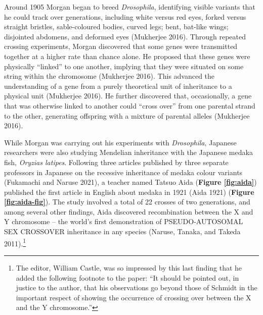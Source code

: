 \documentclass[
]{book}
\begin{document}
Around 1905 Morgan began to breed \emph{Drosophila}, identifying visible variants that he could track over generations, including white versus red eyes, forked versus straight bristles, sable-coloured bodies, curved legs; bent, bat-like wings; disjointed abdomens, and deformed eyes (Mukherjee 2016). Through repeated crossing experiments, Morgan discovered that some genes were transmitted together at a higher rate than chance alone. He proposed that these genes were physically ``linked'' to one another, implying that they were situated on some string within the chromosome (Mukherjee 2016). This advanced the understanding of a gene from a purely theoretical unit of inheritance to a physical unit (Mukherjee 2016). He further discovered that, occasionally, a gene that was otherwise linked to another could ``cross over'' from one parental strand to the other, generating offspring with a mixture of parental alleles (Mukherjee 2016).

While Morgan was carrying out his experiments with \emph{Drosophila}, Japanese researchers were also studying Mendelian inheritance with the Japanese medaka fish, \emph{Oryzias latipes}. Following three articles published by three separate professors in Japanese on the recessive inheritance of medaka colour variants (Fukamachi and Naruse 2021), a teacher named Tatsuo Aida (\textbf{Figure \ref{fig:aida}}) published the first article in English about medaka in 1921 (Aida 1921) (\textbf{Figure \ref{fig:aida-fig}}). The study involved a total of 22 crosses of two generations, and among several other findings, Aida discovered recombination between the X and Y chromosome -- the world's first demonstration of PSEUDO-AUTOSOMAL SEX CROSSOVER inheritance in any species (Naruse, Tanaka, and Takeda 2011).\footnote{The editor, William Castle, was so impressed by this last finding that he added the following footnote to the paper: ``It should be pointed out, in justice to the author, that his observations go beyond those of Schmidt in the important respect of showing the occurrence of crossing over between the X and the Y chromosome.''}
\end{document}
